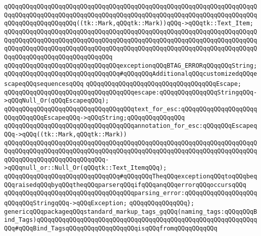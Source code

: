 \verb|qQQqqQQqqQQqqQQqqQQqqQQqqQQqqQQqqQQqqQQqqQQqqQQqqQQqqQQqqQQqqQQqqQQqqQQqqQQqqQQqqQQqqQQqqQQqqQQqqQQqqQQqqQQqqQQqqQQqqQQqqQQqqQQqqQQqqQQqqQQqqQQqqQQqqQQqqQQqqQQq((tk::Mark,qQQqtk::Mark))qQQq->qQQqtk::Text_Item;|\newline
\verb|qQQqqQQqqQQqqQQqqQQqqQQqqQQqqQQqqQQqqQQqqQQqqQQqqQQqqQQqqQQqqQQqqQQqqQQqqQQqqQQqqQQqqQQqqQQqqQQqqQQqqQQqqQQqqQQqqQQqqQQqqQQqqQQqqQQqqQQqqQQqqQQqqQQqqQQqqQQqqQQqqQQqqQQqqQQqqQQqqQQqqQQqqQQqqQQqqQQqqQQqqQQqqQQqqQQqqQQqqQQqqQQqqQQqqQQqqQQqqQQq|\newline
\verb|qQQqqQQqqQQqqQQqqQQqqQQqqQQqqQQqexceptionqQQqBTAG_ERRORqQQqqQQqString;|\newline
\newline
\newline
\verb|qQQqqQQqqQQqqQQqqQQqqQQqqQQqqQQq#qQQqqQQqAdditionalqQQqcustomizedqQQqescapeqQQqsequencesqQQq|\newline
\newline
\verb|qQQqqQQqqQQqqQQqqQQqqQQqqQQqqQQqqQQqEscape;|\newline
\newline
\verb|qQQqqQQqqQQqqQQqqQQqqQQqqQQqqQQqqQQqescape:qQQqqQQqqQQqqQQqStringqQQq->qQQqNull_Or(qQQqEscapeqQQq);|\newline
\newline
\verb|qQQqqQQqqQQqqQQqqQQqqQQqqQQqqQQqqQQqtext_for_esc:qQQqqQQqqQQqqQQqqQQqqQQqqQQqqQQqEscapeqQQq->qQQqString;qQQqqQQqqQQqqQQq|\newline
\newline
\verb|qQQqqQQqqQQqqQQqqQQqqQQqqQQqqQQqqQQqannotation_for_esc:qQQqqQQqEscapeqQQq->qQQq((tk::Mark,qQQqtk::Mark))|\newline
\verb|qQQqqQQqqQQqqQQqqQQqqQQqqQQqqQQqqQQqqQQqqQQqqQQqqQQqqQQqqQQqqQQqqQQqqQQqqQQqqQQqqQQqqQQqqQQqqQQqqQQqqQQqqQQqqQQqqQQqqQQqqQQqqQQqqQQqqQQqqQQqqQQqqQQqqQQqqQQqqQQqqQQqqQQq->qQQqnull_or::Null_Or(qQQqtk::Text_ItemqQQq);|\newline
\newline
\verb|qQQqqQQqqQQqqQQqqQQqqQQqqQQqqQQq#qQQqqQQqTheqQQqexceptionqQQqtoqQQqbeqQQqraisedqQQqbyqQQqtheqQQqparserqQQqifqQQqanqQQqerrorqQQqoccursqQQq|\newline
\verb|qQQqqQQqqQQqqQQqqQQqqQQqqQQqqQQqqQQqparsing_error:qQQqqQQqqQQqqQQqqQQqqQQqqQQqStringqQQq->qQQqException;|\newline
\newline
\verb|qQQqqQQqqQQqqQQq};|\newline
\newline
\verb|genericqQQqpackageqQQqstandard_markup_tags_gqQQq(naming_tags:qQQqqQQqBind_Tags)qQQqqQQqqQQqqQQqqQQqqQQqqQQqqQQqqQQqqQQqqQQqqQQqqQQqqQQqqQQqqQQq#qQQqBind_TagsqQQqqQQqqQQqqQQqqQQqisqQQqfromqQQqqQQqqQQq|\newline
